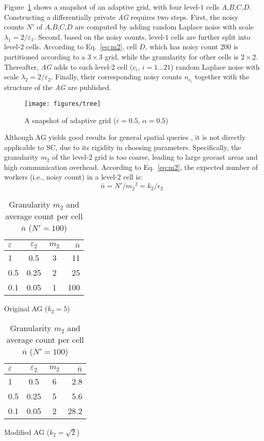 \documentclass{USC-Thesis}
\numberwithin{equation}{chapter}
\begin{document}
Figure~\ref{fig:AG} shows a snapshot of an adaptive grid, with four level-$1$ cells $A$,$B$,$C$,$D$. Constructing a differentially private {\em AG} requires two steps. First, the noisy counts $N'$ of $A$,$B$,$C$,$D$ are computed by adding random Laplace noise with scale $\lambda_1=2/\varepsilon_1$. Second, based on the noisy counts, level-$1$ cells are further split into level-$2$ cells. According to Eq.~\eqref{eq:m2}, cell $D$, which has noisy count $200$ is partitioned according to a $3 \times 3$ grid, while the granularity for other cells is $2 \times 2$. Thereafter, {\em AG} adds to each level-2 cell ($c_i$, $i=1\ldots 21$) random Laplace noise with scale $\lambda_2=2/\varepsilon_2$. Finally, their corresponding noisy counts $n_{c_i}$ together with the structure of the {\em AG} are published.

\begin{figure}[!ht]
	\centering
		\texttt{[image: figures/tree]}
	\caption{A snapshot of adaptive grid ($\varepsilon=0.5$, $\alpha = 0.5$)}
\label{fig:AG}
\end{figure}

Although AG yields good results for general spatial queries \cite{qardaji2012differentially}, it is not directly applicable to SC, due to its rigidity in choosing parameters. Specifically, the granularity $m_2$ of the level-$2$ grid is too coarse, leading to large geocast areas and high communication overhead. According to Eq.~\eqref{eq:m2}, the expected number of workers (i.e., noisy count) in a level-$2$ cell is: 
$$\bar{n}=N'/{m_2}^2=k_2/\epsilon_2$$

\begin{table}[!htb]
    \begin{subtable}{.5\linewidth}
      \centering
		\begin{tabular}{ l | c | c | r }
		\hline
		$\varepsilon$ & \textbf{$\varepsilon_2$} & \textbf{$m_2$} & \textbf{$\bar{n}$} \\
		\hline
		{1} & 0.5 & 3 & 11 \\
		\hline
		{0.5} & 0.25 & 2 & 25 \\
		\hline
		{0.1} & 0.05 & 1 & 100 \\
		\hline
		\end{tabular}
		\caption{Original AG ($k_2=5$)}
		\label{tab:avg_count_old}
    \end{subtable}%
    \begin{subtable}{.5\linewidth}
      \centering
		\begin{tabular}{ l | c | c | r }
		\hline
		$\varepsilon$ & \textbf{$\varepsilon_2$} & \textbf{$m_2$} & \textbf{$\bar{n}$} \\
		\hline
		{1} & 0.5 & 6 & 2.8 \\
		\hline
		{0.5} & 0.25 & 5 & 5.6 \\
		\hline
		{0.1} & 0.05 & 2 & 28.2 \\
		\hline
		\end{tabular}
		\caption{Modified AG ($k_2=\sqrt{2}$)}
		\label{tab:avg_count_new}
    \end{subtable} 
    \caption{Granularity $m_2$ and average count per cell $\bar{n}$ ($N'=100$)}
    \label{tab:avg_count}
\end{table}
\end{document}
